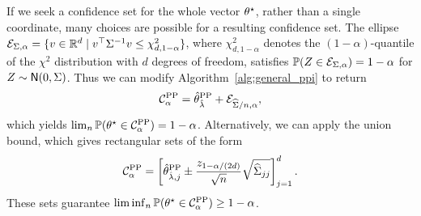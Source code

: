 If we seek a confidence set for the whole vector $\theta^\star$, rather than a
single coordinate, many choices are
possible for a resulting confidence set. The ellipse
$\mathcal{E}_{\Sigma,\alpha} = \{v \in \mathbb{R}^d \mid v^\top \Sigma^{-1} v \le
\chi^2_{d,1-\alpha}\}$, where $\chi^2_{d,1-\alpha}$ denotes the $(1-\alpha)$-quantile
of the $\chi^2$ distribution with $d$ degrees of freedom,
satisfies $\mathbb{P}(Z \in \mathcal{E}_{\Sigma,\alpha}) = 1 - \alpha$ for
$Z \sim \mathsf{N}(0, \Sigma)$. Thus
we can modify Algorithm~\ref{alg:general_ppi} to return
\begin{equation*}
  \mathcal{C}^{\mathrm{PP}}_\alpha = \hat{\theta}^{\mathrm{PP}}_{\hat\lambda}
  + \mathcal{E}_{\widehat{\Sigma} / n, \alpha},
\end{equation*}
which yields $\lim_n \mathbb{P}(\theta^\star \in \mathcal{C}^{\mathrm{PP}}_\alpha) = 1 - \alpha$.
Alternatively, we can apply the union bound, which gives rectangular sets of the form
\begin{equation*}
  \mathcal{C}^{\mathrm{PP}}_\alpha = \left[\hat{\theta}^{\mathrm{PP}}_{\hat\lambda,j} \pm \frac{z_{1-\alpha/(2d)}}{\sqrt{n}}
    \sqrt{\widehat{\Sigma}_{jj}} \right]_{j = 1}^d.
\end{equation*}
These sets guarantee $\liminf_n \mathbb{P}(\theta^\star \in \mathcal{C}^{\mathrm{PP}}_\alpha) \ge 1 - \alpha$.


